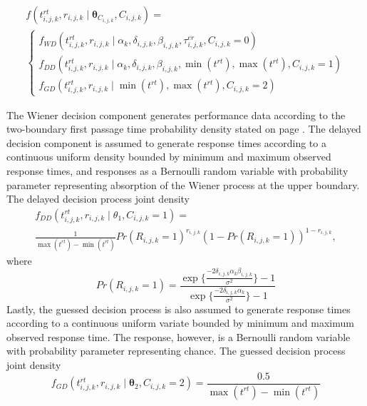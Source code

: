 \documentclass[12pt]{article}
\begin{document}
\begin{gather}
f(t_{i,j,k}^{rt},r_{i,j,k} \mid \boldsymbol{\theta}_{C_{i,j,k}}, C_{i,j,k}) = \nonumber \\
\begin{cases}
f_{WD}(t_{i,j,k}^{rt},r_{i,j,k} \mid \alpha_k,\delta_{i,j,k},\beta_{i,j,k},\tau_{i,j,k}^{er}, C_{i,j,k} = 0) \\
f_{DD}(t_{i,j,k}^{rt},r_{i,j,k} \mid \alpha_k,\delta_{i,j,k},\beta_{i,j,k},\operatorname{min}(t^{rt}),\operatorname{max}(t^{rt}), C_{i,j,k} = 1) \\
f_{GD}(t_{i,j,k}^{rt},r_{i,j,k} \mid \operatorname{min}(t^{rt}),\operatorname{max}(t^{rt}), C_{i,j,k} = 2)
\end{cases}
\end{gather}

	The Wiener decision component generates performance data according to the two-boundary first passage time probability density stated on page \pageref{eq:wd}. The delayed decision component is assumed to generate response times according to a continuous uniform density bounded by minimum and maximum observed response times, and responses as a Bernoulli random variable with probability parameter representing absorption of the Wiener process at the upper boundary. The delayed decision process joint density
\begin{gather}
f_{DD}(t_{i,j,k}^{rt},r_{i,j,k} \mid \theta_1, C_{i,j,k} = 1) = \nonumber \\ 
\frac{1}{\operatorname{max}(t^{rt}) - \operatorname{min}(t^{rt})}Pr(R_{i,j,k}=1)^{r_{i,j,k}}(1-Pr(R_{i,j,k}=1))^{1-r_{i,j,k}},
\end{gather}
where
\begin{equation*}
Pr(R_{i,j,k}=1) = \frac{\operatorname{exp}                   \{\frac{-2\delta_{i,j,k} \alpha_k \beta_{i,j,k}}{\sigma^2}
\} - 1}{\operatorname{exp}\{
\frac{-2\delta_{i,j,k} \alpha_k}{\sigma^2}
\} - 1}
\end{equation*}
Lastly, the guessed decision process is also assumed to generate response times according to a continuous uniform variate bounded by minimum and maximum observed response time. The response, however, is a Bernoulli random variable with probability parameter representing chance. The guessed decision process joint density
\begin{equation}
f_{GD}(t_{i,j,k}^{rt},r_{i,j,k} \mid \boldsymbol{\theta}_2, C_{i,j,k} = 2) = \frac{0.5}{\operatorname{max}(t^{rt})-\operatorname{min}(t^{rt})}
\end{equation}
\end{document}
